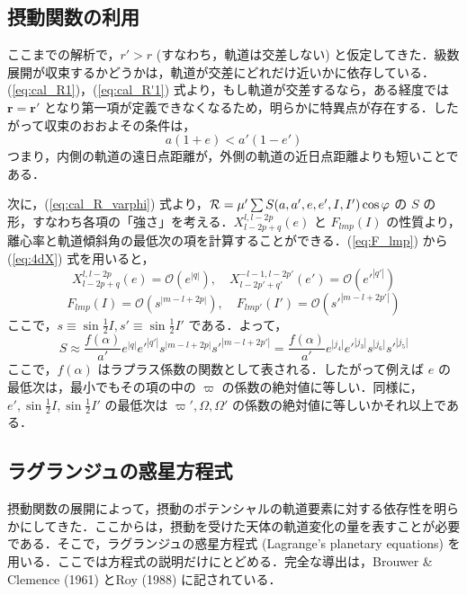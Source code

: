 \documentclass[11pt,a4paper,oneside,onecolumn]{jarticle}
\begin{document}
\subsection{摂動関数の利用}
ここまでの解析で，$r' > r$ (すなわち，軌道は交差しない) と仮定してきた．級数展開が収束するかどうかは，軌道が交差にどれだけ近いかに依存している．(\ref{eq:cal_R1})，(\ref{eq:cal_R'1}) 式より，もし軌道が交差するなら，ある経度では${\bm r} = {\bm r'}$ となり第一項が定義できなくなるため，明らかに特異点が存在する．したがって収束のおおよその条件は，
\begin{equation}
a (1 + e) < a' (1 - e')
\end{equation}
つまり，内側の軌道の遠日点距離が，外側の軌道の近日点距離よりも短いことである．

次に，(\ref{eq:cal_R_varphi}) 式より，${\cal R} = \mu' \sum S (a,a',e,e',I,I') \cos \varphi$ の $S$ の形，すなわち各項の「強さ」を考える．$X_{l - 2p + q}^{l, l - 2p} (e)$ と $F_{lmp} (I)$ の性質より，離心率と軌道傾斜角の最低次の項を計算することができる．(\ref{eq:F_lmp}) から (\ref{eq:4dX}) 式を用いると，
\begin{equation}
X_{l - 2p + q}^{l, l - 2p} (e) = \mathcal{O} (e^{|q|}), \quad X_{l - 2p' + q'}^{-l -1, l - 2p'} (e') = \mathcal{O} (e'^{|q'|})
\end{equation}
\begin{equation}
F_{lmp} (I) = \mathcal{O} (s^{|m - l + 2p|}), \quad F_{lmp'} (I') = \mathcal{O} (s'^{|m - l + 2p'|})
\end{equation}
ここで，$s \equiv \sin \frac{1}{2} I, s' \equiv \sin \frac{1}{2} I'$ である．よって，
\begin{equation}
S \approx \frac{f (\alpha)}{a'} e^{|q|} e'^{|q'|} s^{|m - l + 2p|} s'^{|m - l + 2p'|} = \frac{f (\alpha)}{a'} e^{|j_4|} e'^{|j_3|} s^{|j_6|} s'^{|j_5|} \label{eq:S}
\end{equation}
ここで，$f (\alpha)$ はラプラス係数の関数として表される．したがって例えば $e$ の最低次は，最小でもその項の中の $\varpi$ の係数の絶対値に等しい．同様に，$e', \sin \frac{1}{2} I, \sin \frac{1}{2} I'$ の最低次は $\varpi', \Omega, \Omega'$ の係数の絶対値に等しいかそれ以上である．

\subsection{ラグランジュの惑星方程式}
摂動関数の展開によって，摂動のポテンシャルの軌道要素に対する依存性を明らかにしてきた．ここからは，摂動を受けた天体の軌道変化の量を表すことが必要である．そこで，ラグランジュの惑星方程式 (Lagrange's planetary equations) を用いる．ここでは方程式の説明だけにとどめる．完全な導出は，Brouwer \& Clemence (1961) とRoy (1988) に記されている．
\end{document}
